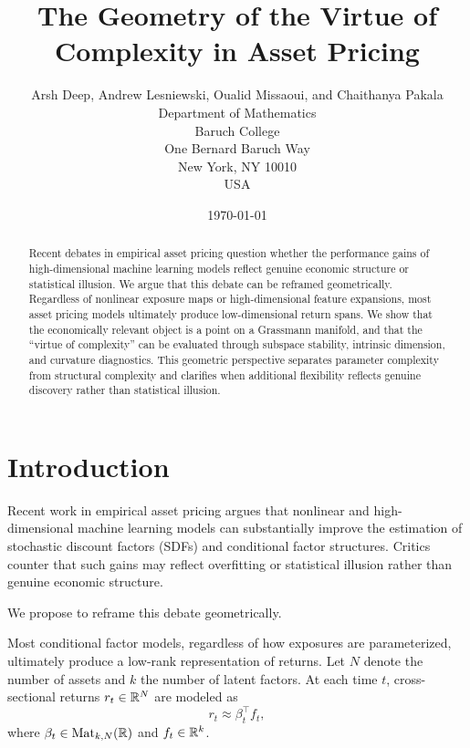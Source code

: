 \documentclass[twoside,11pt,letter]{article}
\begin{document}
\title{The Geometry of the Virtue of Complexity in Asset Pricing}
\author{Arsh Deep, Andrew Lesniewski, Oualid Missaoui, and Chaithanya Pakala\\
Department of Mathematics\\
Baruch College\\
One Bernard Baruch Way\\
New York, NY 10010\\
USA}
\date{\today}

\maketitle

\begin{abstract}
Recent debates in empirical asset pricing question whether the performance gains of high-dimensional machine learning models reflect genuine economic structure or statistical illusion. We argue that this debate can be reframed geometrically. Regardless of nonlinear exposure maps or high-dimensional feature expansions, most asset pricing models ultimately produce low-dimensional return spans. We show that the economically relevant object is a point on a Grassmann manifold, and that the ``virtue of complexity'' can be evaluated through subspace stability, intrinsic dimension, and curvature diagnostics. This geometric perspective separates parameter complexity from structural complexity and clarifies when additional flexibility reflects genuine discovery rather than statistical illusion.
\end{abstract}

\section{Introduction}

Recent work in empirical asset pricing argues that nonlinear and high-dimensional machine learning models can substantially improve the estimation of stochastic discount factors (SDFs) and conditional factor structures. Critics counter that such gains may reflect overfitting or statistical illusion rather than genuine economic structure.

We propose to reframe this debate geometrically.

Most conditional factor models, regardless of how exposures are parameterized, ultimately produce a low-rank representation of returns. Let $N$ denote the number of assets and $k$ the number of latent factors. At each time $t$, cross-sectional returns $r_t\in\mathbb{R}^N$ are modeled as
\begin{equation*}
r_t \approx \beta_t^\top f_t,
\end{equation*}
where $\beta_t \in \mathrm{Mat}_{k,N}(\mathbb{R})$ and $f_t \in \mathbb{R}^k$.
\end{document}
